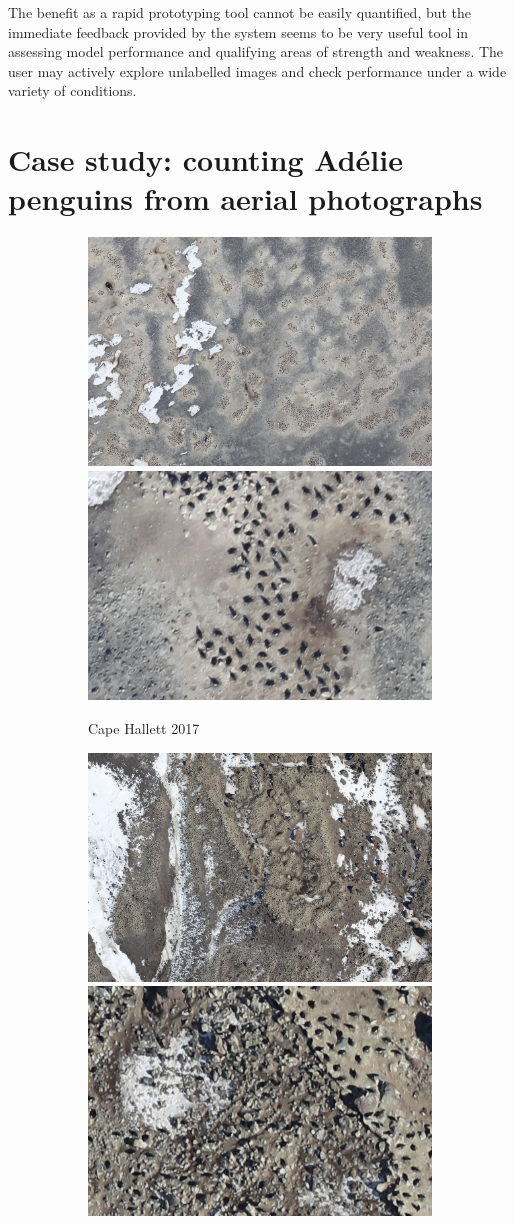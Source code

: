 The benefit as a rapid prototyping tool cannot be easily quantified, but the immediate feedback provided by the system seems to be very useful tool in assessing model performance and qualifying areas of strength and weakness. The user may actively explore unlabelled images and check performance under a wide variety of conditions.


\section{Case study: counting Adélie penguins from aerial photographs}
\label{sec:case_penguins}

\begin{figure}[H]
\centering
\begin{subfigure}[t]{1.0\linewidth}
  \includegraphics[width=0.475\linewidth]{figures/annotation/penguin/hallet_large.jpg}
  \hfill
  \includegraphics[width=0.475\linewidth]{figures/annotation/penguin/hallet.jpg}
  \caption{Cape Hallett 2017}
\end{subfigure}
\begin{subfigure}[t]{1.0\linewidth}
  \includegraphics[width=0.475\linewidth]{figures/annotation/penguin/cotter_large.jpg}
  \hfill 
  \includegraphics[width=0.475\linewidth]{figures/annotation/penguin/cotter.jpg}

\end{subfigure}
\end{figure}
